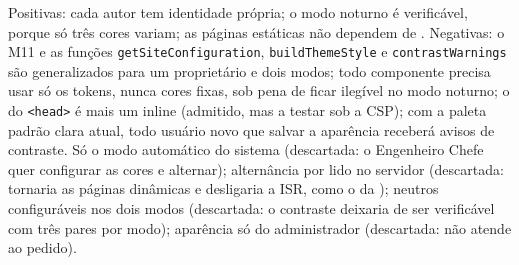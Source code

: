 {Positivas: cada autor tem identidade própria; o modo noturno é verificável, porque só três cores variam; as páginas estáticas não dependem de . Negativas: o M11 e as funções \texttt{getSiteConfiguration}, \texttt{buildThemeStyle} e \texttt{contrastWarnings} são generalizados para um proprietário e dois modos; todo componente precisa usar só os tokens, nunca cores fixas, sob pena de ficar ilegível no modo noturno; o  do \texttt{<head>} é mais um  inline (admitido, mas a testar sob a CSP); com a paleta padrão clara atual, todo usuário novo que salvar a aparência receberá avisos de contraste.}
{Só o modo automático do sistema (descartada: o Engenheiro Chefe quer configurar as cores e alternar); alternância por  lido no servidor (descartada: tornaria as páginas dinâmicas e desligaria a ISR, como o  da ); neutros configuráveis nos dois modos (descartada: o contraste deixaria de ser verificável com três pares por modo); aparência só do administrador (descartada: não atende ao pedido).}

